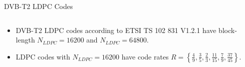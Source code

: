 \documentclass[11pt, aspectratio=169]{beamer}
\begin{document}
\begin{frame}{DVB-T2 LDPC Codes}
\begin{columns}
\begin{column}{0.55\textwidth}
\begin{center}
{\begin{table}
				
				
				
			\end{table}
			}
		\end{center}
	\end{column}
\end{columns}



%
%
%
%
%	
%	

\begin{itemize}
\item DVB-T2 LDPC codes according to ETSI TS 102 831 V1.2.1 have block-length $N_{LDPC}=16200$ and $N_{LDPC}=64800$.

\item LDPC codes with $N_{LDPC}=16200$ have code rates $R=\left \{ \frac{4}{9}, \frac{3}{5}, \frac{2}{3},\frac{11}{15},\frac{7}{9},\frac{37}{45} \right \}$.


\end{itemize}
\end{frame}
\end{document}
